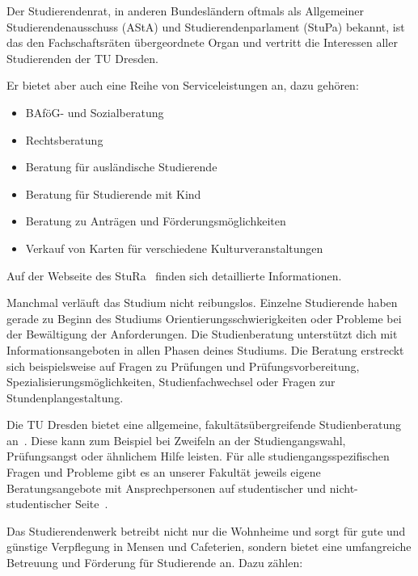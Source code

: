 \label{sec:stura}
Der Studierendenrat, in anderen Bundesländern oftmals als Allgemeiner Studierendenausschuss (AStA) und Studierendenparlament (StuPa) bekannt, ist das den Fachschaftsräten übergeordnete Organ und vertritt die Interessen aller Studierenden der TU Dresden.

Er bietet aber auch eine Reihe von Serviceleistungen an, dazu gehören:
\begin{itemize}
\item BAföG- und Sozialberatung
\item Rechtsberatung
\item Beratung für ausländische Studierende
\item Beratung für Studierende mit Kind
\item Beratung zu Anträgen und Förderungsmöglichkeiten
\item Verkauf von Karten für verschiedene Kulturveranstaltungen
\end{itemize}

Auf der Webseite des StuRa~ finden sich detaillierte Informationen.


Manchmal verläuft das Studium nicht reibungslos.
Einzelne Studierende haben gerade zu Beginn des Studiums Orientierungsschwierigkeiten oder Probleme bei der Bewältigung der Anforderungen.
Die Studienberatung unterstützt dich mit Informationsangeboten in allen Phasen deines Studiums.
Die Beratung erstreckt sich beispielsweise auf Fragen zu Prüfungen und Prüfungsvorbereitung, Spezialisierungsmöglichkeiten, Studienfachwechsel oder Fragen zur Stundenplangestaltung.

Die TU Dresden bietet eine allgemeine, fakultätsübergreifende Studienberatung an~. Diese kann zum Beispiel bei Zweifeln an der Studiengangswahl, Prüfungsangst oder ähnlichem Hilfe leisten. Für alle studiengangsspezifischen Fragen und Probleme gibt es an unserer Fakultät jeweils eigene Beratungsangebote mit Ansprechpersonen auf studentischer und nicht-studentischer Seite~.

\label{sec:stuwe}
Das Studierendenwerk betreibt nicht nur die Wohnheime und sorgt für gute und günstige Verpflegung in Mensen und Cafeterien, sondern bietet eine umfangreiche Betreuung und Förderung für Studierende an. Dazu zählen:

